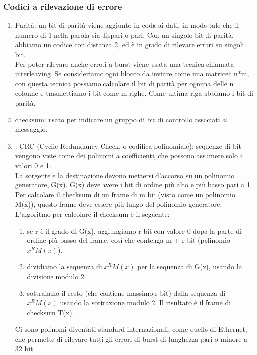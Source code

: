 \documentclass{article}
\begin{document}
\subsubsection{Codici a rilevazione di errore}
\begin{enumerate}
\item Parità: un bit di parità viene aggiunto in coda ai dati, in modo tale che il numero di 1 nella parola sia dispari o pari. Con un singolo bit di parità, abbiamo un codice con distanza 2, ed è in grado di rilevare errori su singoli bit.\\
Per poter rilevare anche errori a burst viene usata una tecnica chiamata interleaving. Se consideriamo ogni blocco da inviare come una matricec n*m, con questa tecnica possiamo calcolare il bit di parità per ognuna delle n colonne e trasmettiamo i bit come m righe. Come ultima riga abbiamo i bit di parità.\\
\item checksum: usato per indicare un gruppo di bit di controllo associati al messaggio. 
\item: CRC (Cyclic Redundancy Check, o codifica polinomiale): sequenze di bit vengono viste come dei polinomi a coefficienti, che possono assumere solo i valori 0 e 1.\\
La sorgente e la destinazione devono mettersi d'accorso su un polinomio generatore, G(x). G(x) deve avere i bit di ordine più alto e più basso pari a 1.\\
Per calcolare il checksum di un frame di m bit (visto come un polinomio M(x)), questo frame deve essere più lungo del polinomio generatore. L'algoritmo per calcolare il checksum è il seguente:
\begin{enumerate}
\item se r è il grado di G(x), aggiungiamo r bit con valore 0 dopo la parte di ordine più basso del frame, così che contenga m + r bit (polinomio $x^RM(x)$).
\item dividiamo la sequenza di $x^RM(x)$ per la sequenza di G(x), usando la divisione modulo 2.
\item sottraiamo il resto (che contiene massimo r bit) dalla sequenza di $x^RM(x)$ usando la sottrazione modulo 2. Il risultato è il frame di checksum T(x).
\end{enumerate}
Ci sono polinomi diventati standard internazionali, come quello di Ethernet, che permette di rilevare tutti gli errori di burst di lunghezza pari o minore a 32 bit.
\end{enumerate}
\end{document}
